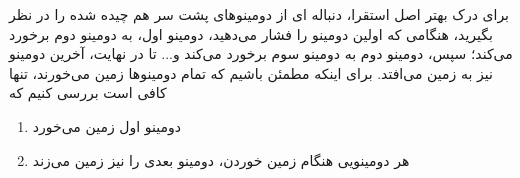     برای درک بهتر اصل استقرا، دنباله ای از دومینوهای پشت سر هم چیده شده را در نظر بگیرید، 
    هنگامی که اولین دومینو را فشار می‌دهید، دومینو اول، به دومینو دوم برخورد می‌کند؛ سپس، دومینو
    دوم به دومینو سوم برخورد می‌کند و... تا در نهایت، آخرین دومینو نیز به زمین می‌افتد.
    برای اینکه مطمئن باشیم که تمام دومینوها زمین می‌خورند، تنها کافی است بررسی کنیم که 
    \begin{enumerate}
        \item دومینو اول زمین می‌خورد
                
        \item هر دومینویی هنگام زمین خوردن، دومینو بعدی را نیز زمین می‌زند
    \end{enumerate} 


